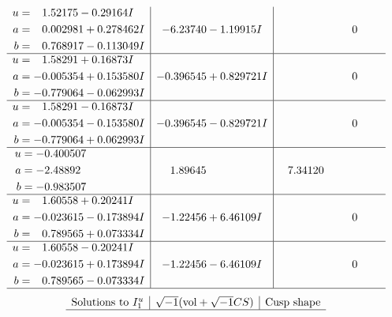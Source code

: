 \documentclass[1p]{elsarticle_modified}
\theoremstyle{definition}
\newcommand{\I}{\sqrt{-1}}
\begin{document}
$$\begin{array}{c|c|c}
\begin{aligned}
u &= \phantom{-}1.52175 - 0.29164 I \\
a &= \phantom{-}0.002981 + 0.278462 I \\
b &= \phantom{-}0.768917 - 0.113049 I\end{aligned}
 & -6.23740 - 1.19915 I & \phantom{-0.000000 } 0 \\ \hline\begin{aligned}
u &= \phantom{-}1.58291 + 0.16873 I \\
a &= -0.005354 + 0.153580 I \\
b &= -0.779064 - 0.062993 I\end{aligned}
 & -0.396545 + 0.829721 I & \phantom{-0.000000 } 0 \\ \hline\begin{aligned}
u &= \phantom{-}1.58291 - 0.16873 I \\
a &= -0.005354 - 0.153580 I \\
b &= -0.779064 + 0.062993 I\end{aligned}
 & -0.396545 - 0.829721 I & \phantom{-0.000000 } 0 \\ \hline\begin{aligned}
u &= -0.400507\phantom{ +0.000000I} \\
a &= -2.48892\phantom{ +0.000000I} \\
b &= -0.983507\phantom{ +0.000000I}\end{aligned}
 & \phantom{-}1.89645\phantom{ +0.000000I} & \phantom{-}7.34120\phantom{ +0.000000I} \\ \hline\begin{aligned}
u &= \phantom{-}1.60558 + 0.20241 I \\
a &= -0.023615 - 0.173894 I \\
b &= \phantom{-}0.789565 + 0.073334 I\end{aligned}
 & -1.22456 + 6.46109 I & \phantom{-0.000000 } 0 \\ \hline\begin{aligned}
u &= \phantom{-}1.60558 - 0.20241 I \\
a &= -0.023615 + 0.173894 I \\
b &= \phantom{-}0.789565 - 0.073334 I\end{aligned}
 & -1.22456 - 6.46109 I & \phantom{-0.000000 } 0\\
 \hline 
 \end{array}$$\newpage$$\begin{array}{c|c|c}  
\text{Solutions to }I^u_{1}& \I (\text{vol} + \sqrt{-1}CS) & \text{Cusp shape}\\
 \hline 

\end{array}$$
\end{document}

